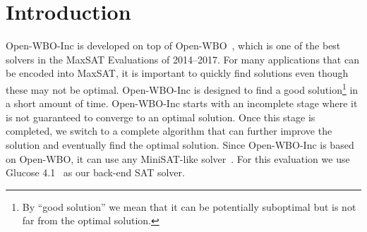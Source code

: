 \documentclass[conference]{IEEEtran}
\newcommand{\openwbo}{\textsf{Open-WBO}\xspace}
\newcommand{\toolname}{\textsf{Open-WBO-Inc}\xspace}
\begin{document}




\maketitle






%
\IEEEpeerreviewmaketitle



\section{Introduction}

\toolname is developed on top of \openwbo~\cite{martins-sat14,martins-cp14,neves-sat15},
which is one of the best solvers in the MaxSAT Evaluations
of 2014--2017.
%
For many applications that can be encoded into MaxSAT, it is important to quickly find solutions even though these may not be optimal.
%
\toolname is designed to find a good solution\footnote{By ``good solution'' we mean that it can be potentially suboptimal but is not far from the optimal solution.} in a short amount of time. \toolname starts with an incomplete stage where it is not guaranteed to converge to an optimal solution. Once this stage is completed, we switch to a complete algorithm that can further improve the solution and eventually find the optimal solution.
%
Since \toolname is based on Open-WBO, it  can use any MiniSAT-like
solver~\cite{minisat-sat03}. For this evaluation we use Glucose 4.1~\cite{audemard-ijcai09} as our back-end SAT solver.  
\end{document}
